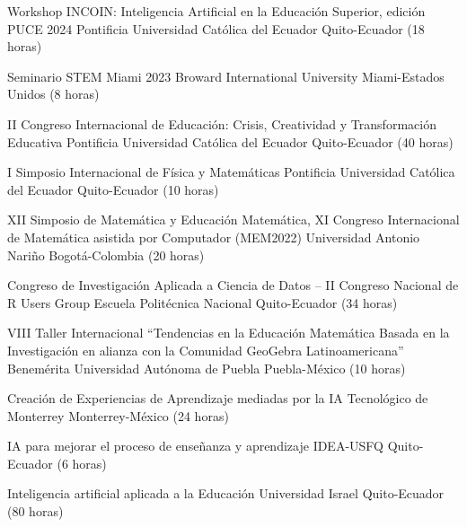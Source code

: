 \documentclass[
	a4paper,
	maincolor=cvblue!70!blue,
	sidecolor=gray!30,
	sectioncolor=cvblue!70!blue,
    sidebarwidth=7.5cm,
	topbottommargin=20pt,
	leftrightmargin=20pt,
]{fortysecondscv}
\begin{document}

    
    {Workshop INCOIN: Inteligencia Artificial en la Educación Superior, edición PUCE 2024}
    {Pontificia Universidad Católica del Ecuador}
    {Quito-Ecuador (18 horas)}
    
    {Seminario STEM Miami 2023}
    {Broward International University}
    {Miami-Estados Unidos (8 horas)}

    {II Congreso Internacional de Educación: Crisis, Creatividad y Transformación Educativa}
    {Pontificia Universidad Católica del Ecuador}
    {Quito-Ecuador (40 horas)}

    {I Simposio Internacional de Física y Matemáticas}
    {Pontificia Universidad Católica del Ecuador}
    {Quito-Ecuador (10 horas)}

    {XII Simposio de Matemática y Educación Matemática, XI Congreso Internacional de Matemática asistida por Computador (MEM2022)}
    {Universidad Antonio Nariño}
    {Bogotá-Colombia (20 horas)}

    {Congreso de Investigación Aplicada a Ciencia de Datos – II Congreso Nacional de R Users Group}
    {Escuela Politécnica Nacional}
    {Quito-Ecuador (34 horas)}

    {VIII Taller Internacional “Tendencias en la Educación Matemática Basada en la Investigación en alianza con la Comunidad GeoGebra Latinoamericana”}
    {Benemérita Universidad Autónoma de Puebla}
    {Puebla-México (10 horas)}



    {Creación de Experiencias de Aprendizaje mediadas por la IA}
    {Tecnológico de Monterrey}
    {Monterrey-México (24 horas)}

    {IA para mejorar el proceso de enseñanza y aprendizaje}
    {IDEA-USFQ}
    {Quito-Ecuador (6 horas)}

    {Inteligencia artificial aplicada a la Educación}
    {Universidad Israel}
    {Quito-Ecuador (80 horas)}
\end{document}
